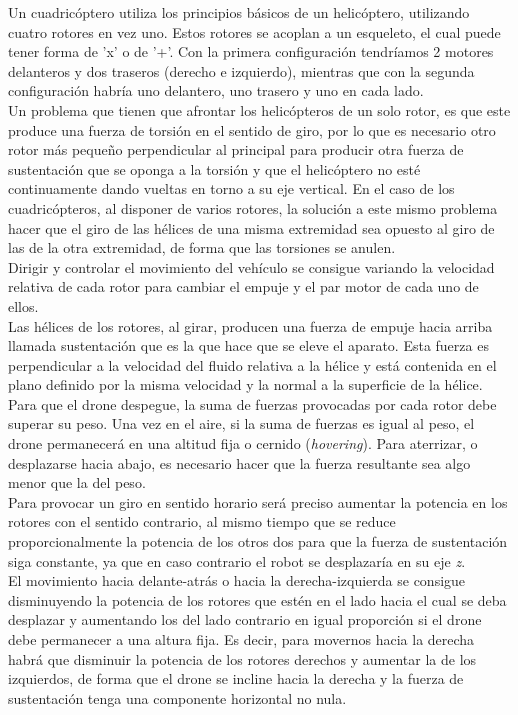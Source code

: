 Un cuadricóptero utiliza los principios básicos de un helicóptero, utilizando cuatro rotores en vez uno. Estos rotores se acoplan a un esqueleto, el cual puede tener forma de 'x' o de '+'. Con la primera configuración tendríamos 2 motores delanteros y dos traseros (derecho e izquierdo), mientras que con la segunda configuración habría uno delantero, uno trasero y uno en cada lado. \\

Un problema que tienen que afrontar los helicópteros de un solo rotor, es que este produce una fuerza de torsión en el sentido de giro, por lo que es necesario otro rotor más pequeño perpendicular al principal para producir otra fuerza de sustentación que se oponga a la torsión y que el helicóptero no esté continuamente dando vueltas en torno a su eje vertical. En el caso de los cuadricópteros, al disponer de varios rotores, la solución a este mismo problema hacer que el giro de las hélices de una misma extremidad sea opuesto al giro de las de la otra extremidad, de forma que las torsiones se anulen.\\

Dirigir y controlar el movimiento del vehículo se consigue variando la velocidad relativa de cada rotor para cambiar el empuje y el par motor de cada uno de ellos.\\

Las hélices de los rotores, al girar, producen una fuerza de empuje hacia arriba llamada sustentación que es la que hace que se eleve el aparato. Esta fuerza es perpendicular a la velocidad del fluido relativa a la hélice y está contenida en el plano definido por la misma velocidad y la normal a la superficie de la hélice. Para que el drone despegue, la suma de fuerzas provocadas por cada rotor debe superar su peso. Una vez en el aire, si la suma de fuerzas es igual al peso, el drone permanecerá en una altitud fija o cernido (\emph{hovering}). Para aterrizar, o desplazarse hacia abajo, es necesario hacer que la fuerza resultante sea algo menor que la del peso.\\


Para provocar un giro en sentido horario será preciso aumentar la potencia en los rotores con el sentido contrario, al mismo tiempo que se reduce proporcionalmente la potencia de los otros dos para que la fuerza de sustentación siga constante, ya que en caso contrario el robot se desplazaría en su eje \emph{z}.\\


El movimiento hacia delante-atrás o hacia la derecha-izquierda se consigue disminuyendo la potencia de los rotores que estén en el lado hacia el cual se deba desplazar y aumentando los del lado contrario en igual proporción si el drone debe permanecer a una altura fija. Es decir, para movernos hacia la derecha habrá que disminuir la potencia de los rotores derechos y aumentar la de los izquierdos, de forma que el drone se incline hacia la derecha y la fuerza de sustentación tenga una componente horizontal no nula.\\

